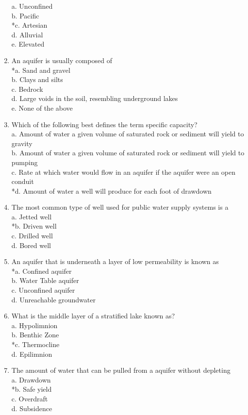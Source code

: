 \begin{enumerate}[1.]
 a. Unconfined\\
 b. Pacific\\
 *c. Artesian\\
 d. Alluvial\\
 e. Elevated\\
 \item An aquifer is usually composed of\\
*a. Sand and gravel\\
b. Clays and silts\\
c. Bedrock\\
d. Large voids in the soil, resembling underground lakes\\
e. None of the above\\
\item Which of the following best defines the term specific capacity?\\
a. Amount of water a given volume of saturated rock or sediment will yield to gravity\\
b. Amount of water a given volume of saturated rock or sediment will yield to pumping\\
c. Rate at which water would flow in an aquifer if the aquifer were an open conduit\\
*d. Amount of water a well will produce for each foot of drawdown\\
\item The most common type of well used for public water supply systems is a\\
a. Jetted well\\
*b. Driven well\\
c. Drilled well\\
d. Bored well 
\item An aquifer that is underneath a layer of low permeability is known as\\
*a. Confined aquifer\\
b. Water Table aquifer\\
c. Unconfined aquifer\\
d. Unreachable groundwater\\
\item What is the middle layer of a stratified lake known as?\\
a. Hypolimnion\\
b. Benthic Zone\\
*c. Thermocline\\
d. Epilimnion\\
\item The amount of water that can be pulled from a aquifer without depleting\\
a. Drawdown\\
*b. Safe yield\\
c. Overdraft\\
d. Subsidence\\

\end{enumerate}

